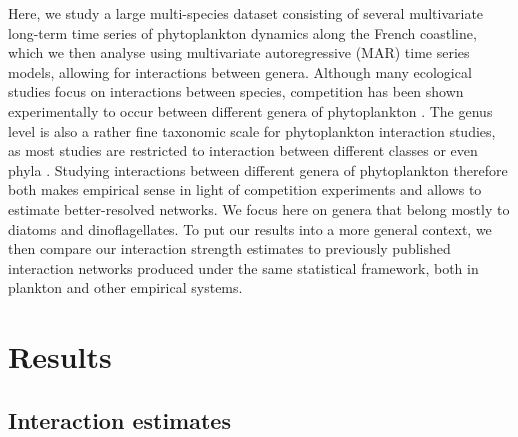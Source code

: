 \documentclass[9pt,twocolumn,twoside,lineno]{pnas-new}
\begin{document}
Here, we study a large multi-species dataset consisting of several
multivariate long-term time series of phytoplankton dynamics along
the French coastline, which we then analyse using multivariate autoregressive
(MAR) time series models, allowing for interactions between genera.
Although many ecological studies focus on interactions between species,
competition has been shown experimentally to occur between different
genera of phytoplankton \cite{titman_ecological_1976,descamps-julien_stable_2005}.
The genus level is also a rather fine taxonomic scale for phytoplankton
interaction studies, as most studies are restricted to interaction
between different classes or even phyla \cite{ives_estimating_2003,hampton_sixty_2008,griffiths_phytoplankton_2015}.
Studying interactions between different genera of phytoplankton therefore
both makes empirical sense in light of competition experiments and
allows to estimate better-resolved networks. We focus here on genera
that belong mostly to diatoms and dinoflagellates. To put our results
into a more general context, we then compare our interaction strength
estimates to previously published interaction networks produced under
the same statistical framework, both in plankton and other empirical
systems. 


\section*{Results}
\subsection*{Interaction estimates}
\end{document}
